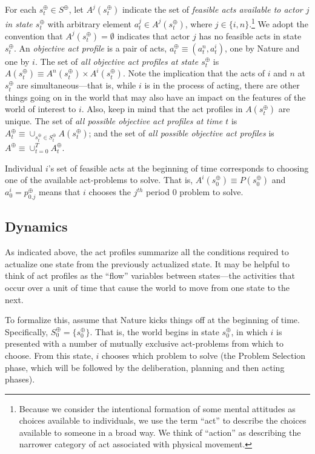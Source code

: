 \documentclass[
11pt,
titlepage,
reqno,
]{article}%
\theoremstyle{definition}
\begin{document}
	For each  $s^\oplus_t\in S^\oplus$, let $A^j(s^\oplus_t)$ indicate the set of \textit{feasible acts available to actor $j$ in state $s^\oplus_t$} with arbitrary element $a^j_t\in A^j(s^\oplus_t)$, where $j\in\{i,n\}$.\footnote
	{
		Because we consider the intentional formation of some mental attitudes as choices available to individuals, we use the term ``act'' to describe the choices available to someone in a broad way.
		We think of ``action'' as describing the narrower category of act associated with physical movement.
	} 
	We adopt the convention that $A^j(s^\oplus_t)=\emptyset$ indicates that actor $j$ has no feasible acts in state $s^\oplus_t$.
	An \textit{objective act profile} is a pair of acts, $a^\oplus_t\equiv(a^n_t,a^i_t)$, one by Nature and one by $i$. 
	The set of \textit{all objective act profiles at state $s^\oplus_t$} is $A(s^\oplus_t)\equiv A^n(s^\oplus_t)\times A^i(s^\oplus_t)$.
	Note the implication that the acts of $i$ and $n$ at $s^\oplus_t$ are simultaneous---that is, while $i$ is in the process of acting, there are other things going on in the world that may also have an impact on the features of the world of interest to $i$.
	Also, keep in mind that the act profiles in $A(s^\oplus_t)$ are unique.
	The set of \textit{all possible objective act profiles at time $t$} is  $A^\oplus_t\equiv \cup_{s^\oplus_t\in S^\oplus_t} A(s^\oplus_t)$; and the set of \textit{all possible objective act profiles} is $A^\oplus\equiv \cup_{t=0}^{T} A^\oplus_t$. 
	
	Individual $i$'s set of feasible acts at the beginning of time corresponds to choosing one of the available act-problems to solve. 
	That is, $A^i(s^\oplus_0)\equiv P(s^\oplus_0)$ and $a^i_0=p^\oplus_{0.j}$ means that $i$ chooses the $j^{th}$ period $0$ problem to solve. 
	
	
	
	\subsection{Dynamics} 
	
	As indicated above, the act profiles summarize all the conditions required to actualize one state from the previously actualized state. 
	It may be helpful to think of act profiles as the ``flow'' variables between states---the activities that occur over a unit of time that cause the world to move from one state to the next.
	
	To formalize this, assume that Nature kicks things off at the beginning of time.
	Specifically, $S^\oplus_0=\{s^\oplus_0\}$.
	That is, the world begins in state $s^\oplus_0$, in which $i$ is presented with a number of mutually exclusive act-problems from which to choose.
	From this state, $i$ chooses which problem to solve (the Problem Selection phase, which will be  followed by the deliberation, planning and then acting phases).
	
\end{document}

